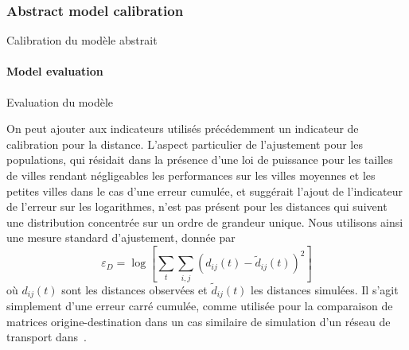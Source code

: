 \subsubsection{Abstract model calibration}{Calibration du modèle abstrait}




\paragraph{Model evaluation}{Evaluation du modèle}

On peut ajouter aux indicateurs utilisés précédemment un indicateur de calibration pour la distance. L'aspect particulier de l'ajustement pour les populations, qui résidait dans la présence d'une loi de puissance pour les tailles de villes rendant négligeables les performances sur les villes moyennes et les petites villes dans le cas d'une erreur cumulée, et suggérait l'ajout de l'indicateur de l'erreur sur les logarithmes, n'est pas présent pour les distances qui suivent une distribution concentrée sur un ordre de grandeur unique. Nous utilisons ainsi une mesure standard d'ajustement, donnée par
\[
\varepsilon_D = \log \left[ \sum_t \sum_{i,j} \left(d_{ij}(t) - \tilde{d}_{ij}(t)\right)^2\right]
\]
où $d_{ij}(t)$ sont les distances observées et $\tilde{d}_{ij}(t)$ les distances simulées. Il s'agit simplement d'une erreur carré cumulée, comme utilisée pour la comparaison de matrices origine-destination dans un cas similaire de simulation d'un réseau de transport dans~\cite{jacobs2016transport}.





